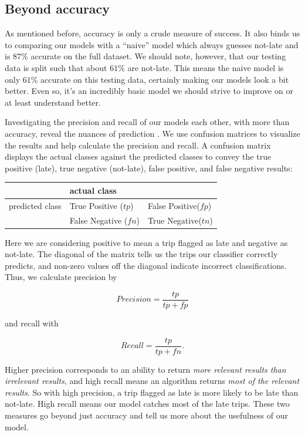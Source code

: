 \documentclass[11pt]{article} %
\begin{document}
\subsection{Beyond accuracy}
\label{sec:beyond_accuracy}
As mentioned before, accuracy is only a crude measure of success. It also binds us
to comparing our models with a ``naive'' model which always guesses not-late and
is $87\%$ accurate on the full dataset. We should note, however, that our testing
data is split such that about $61\%$ are not-late. This means the naive model is
only $61\%$ accurate on this testing data, certainly making our models look a bit
better. Even so, it's an incredibly basic model we should strive to improve on
or at least understand better.

Investigating the precision and recall 
of our models each other,
with more than accuracy, reveal the nuances of prediction \cite{classifierEval}. 
We use confusion matrices to visualize the results and help calculate the 
precision and recall. A confusion matrix displays the actual classes against 
the predicted classes to convey the true positive (late), true negative 
(not-late), false positive, and false negative results:

\begin{center}
\begin{tabular}[h]{l|ll}
                     & actual class &  \\
     \hline
     predicted class & True Positive ($tp$)& False Positive($fp$)\\
                     & False Negative ($fn$)& True Negative($tn$)\\
\end{tabular}
\end{center}

Here we are considering positive to mean a trip flagged as 
late and negative as not-late. The diagonal of the matrix tells us the trips our
classifier correctly predicts, and non-zero values off the diagonal indicate 
incorrect classifications. Thus, we calculate precision by

\[Precision=\frac{tp}{tp+fp}\]

and recall with

\[Recall=\frac{tp}{tp+fn}.\]

Higher precision corresponds to an ability to return \textit{more relevant results 
than irrelevant results}, and high recall means an algorithm returns \textit{most of
the relevant results}.  So with high precision, a trip flagged as late is more 
likely to be late than not-late. High recall means our model catches most of
the late trips. These two measures go beyond just accuracy and tell us more about
the usefulness of our model.
\end{document}
